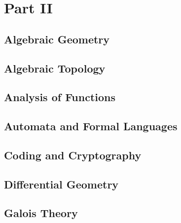 \part{Part II}

\chapter{Algebraic Geometry}
\begingroup
\graphicspath{{../part-ii/algebraic-geometry/}}


\endgroup
\chapter{Algebraic Topology}
\begingroup
\graphicspath{{../part-ii/algebraic-topology/}}


\endgroup
\chapter{Analysis of Functions}
\begingroup
\graphicspath{{../part-ii/analysis-of-functions/}}


\endgroup
\chapter{Automata and Formal Languages}
\begingroup
\graphicspath{{../part-ii/automata-and-formal-languages/}}


\endgroup
\chapter{Coding and Cryptography}
\begingroup
\graphicspath{{../part-ii/coding-and-cryptography/}}


\endgroup
\chapter{Differential Geometry}
\begingroup
\graphicspath{{../part-ii/differential-geometry/}}


\endgroup
\chapter{Galois Theory}
\begingroup
\graphicspath{{../part-ii/galois-theory/}}


\endgroup
